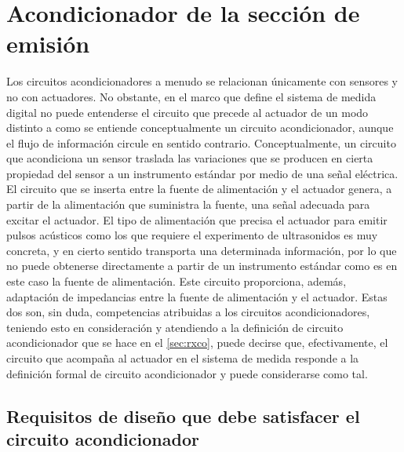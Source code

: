 \section{Acondicionador de la sección de emisión}

Los circuitos acondicionadores a menudo se relacionan únicamente con
sensores y no con actuadores. No obstante, en el marco que define el
sistema de medida digital no puede entenderse el circuito que precede al
actuador de un modo distinto a como se entiende conceptualmente un circuito
acondicionador, aunque el flujo de información circule en sentido
contrario. Conceptualmente, un circuito que acondiciona un sensor traslada
las variaciones que se producen en cierta propiedad del sensor a un
instrumento estándar por medio de una señal eléctrica. El circuito que se
inserta entre la fuente de alimentación y el actuador genera, a partir de
la alimentación que suministra la fuente, una señal adecuada para excitar
el actuador. El tipo de alimentación que precisa el actuador para emitir
pulsos acústicos como los que requiere el experimento de ultrasonidos es
muy concreta, y en cierto sentido transporta una determinada información,
por lo que no puede obtenerse directamente a partir de un instrumento
estándar como es en este caso la fuente de alimentación. Este circuito
proporciona, además, adaptación de impedancias entre la fuente de
alimentación y el actuador. Estas dos son, sin duda, competencias
atribuidas a los circuitos acondicionadores, teniendo esto en consideración
y atendiendo a la definición de circuito acondicionador que se hace en el
\cref{sec:rxco}, puede decirse que, efectivamente, el circuito que acompaña
al actuador en el sistema de medida responde a la definición formal de
circuito acondicionador y puede considerarse como tal.


\subsection[Requisitos de diseño del acondicionador]{Requisitos de diseño
que debe satisfacer el circuito acondicionador}

